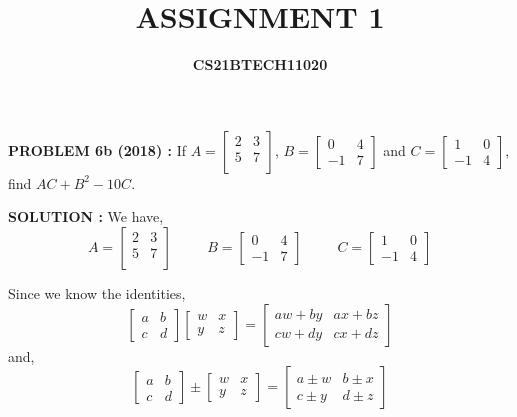 \documentclass[journal,12pt,twocolumn]{IEEEtran}
\title{\textbf{ASSIGNMENT 1}}
\author{\textbf{CS21BTECH11020}}
\date{}
\begin{document}
  \maketitle
  \textbf{PROBLEM 6b (2018) :} 
      If $ A= \begin{bmatrix}
        2 & 3 \\
        5 & 7 \\
      \end{bmatrix}$,
      $ B= \begin{bmatrix}
        0 & 4 \\
        -1 & 7
      \end{bmatrix}$ and 
      $ C = \begin{bmatrix}
        1 & 0 \\
        -1 & 4
      \end{bmatrix}$, find $ AC+B^2-10C$.

  \bigskip

  \textbf{SOLUTION : }We have,
    $$ A= \begin{bmatrix}
      2 & 3 \\
      5 & 7 \\
    \end{bmatrix} \hspace{30pt}
     B= \begin{bmatrix}
      0 & 4 \\
      -1 & 7
    \end{bmatrix} \hspace{30pt}
     C = \begin{bmatrix}
      1 & 0 \\
      -1 & 4
    \end{bmatrix}$$

    Since we know the identities,
    \begin{equation}
       \begin{bmatrix}
        a & b \\
        c & d
      \end{bmatrix}
      \begin{bmatrix}
        w & x \\
        y & z
      \end{bmatrix}
      =
      \begin{bmatrix}
        aw+by & ax+bz \\
        cw+dy & cx+dz
      \end{bmatrix}
    \end{equation}
    and,
    \begin{equation}
      \begin{bmatrix}
        a & b \\
        c & d
      \end{bmatrix}
      \pm
      \begin{bmatrix}
        w & x \\
        y & z
      \end{bmatrix}
      =
      \begin{bmatrix}
        a\pm w & b\pm x \\
        c\pm y & d\pm z
      \end{bmatrix}
    \end{equation}
    
\end{document}
